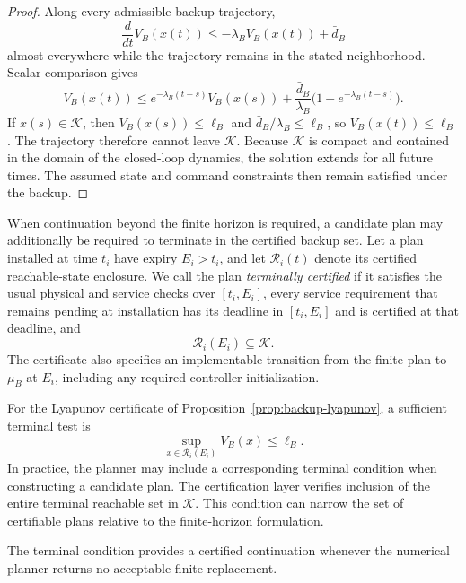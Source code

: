 \documentclass[journal,10pt]{IEEEtran}
\begin{document}
\begin{proof}
Along every admissible backup trajectory,
\[
\frac{d}{dt}V_B(x(t))
\le -\lambda_B V_B(x(t))+\bar d_B
\]
almost everywhere while the trajectory remains in the stated neighborhood.
Scalar comparison gives
\[
V_B(x(t))
\le
e^{-\lambda_B(t-s)}V_B(x(s))
+
\frac{\bar d_B}{\lambda_B}
\bigl(1-e^{-\lambda_B(t-s)}\bigr).
\]
If $x(s)\in\mathcal K$, then
$V_B(x(s))\le\ell_B$ and
$\bar d_B/\lambda_B\le\ell_B$, so
$V_B(x(t))\le\ell_B$. The trajectory therefore cannot leave
$\mathcal K$. Because $\mathcal K$ is compact and contained in the domain of
the closed-loop dynamics, the solution extends for all future times. The
assumed state and command constraints then remain satisfied under the backup.
\end{proof}

When continuation beyond the finite horizon is required, a candidate plan may
additionally be required to terminate in the certified backup set. Let a plan
installed at time $t_i$ have expiry $E_i>t_i$, and let
$\mathcal R_i(t)$ denote its certified reachable-state enclosure. We call the
plan \emph{terminally certified} if it satisfies the usual physical and
service checks over $[t_i,E_i]$, every service requirement that remains pending at installation has its
deadline in $[t_i,E_i]$ and is certified at that deadline, and
\begin{equation}
\mathcal R_i(E_i)\subseteq\mathcal K.
\label{eq:backup-terminal-landing}
\end{equation}
The certificate also specifies an implementable transition from the finite
plan to $\mu_B$ at $E_i$, including any required controller initialization.

For the Lyapunov certificate of
Proposition~\ref{prop:backup-lyapunov}, a sufficient terminal test is
\begin{equation}
\sup_{x\in\mathcal R_i(E_i)}V_B(x)\le\ell_B.
\label{eq:backup-computable-landing}
\end{equation}
In practice, the planner may include a corresponding terminal condition when
constructing a candidate plan. The certification layer verifies inclusion of
the entire terminal reachable set in $\mathcal K$. This condition can narrow
the set of certifiable plans relative to the finite-horizon formulation.

The terminal condition provides a certified continuation whenever the
numerical planner returns no acceptable finite replacement.
\end{document}
